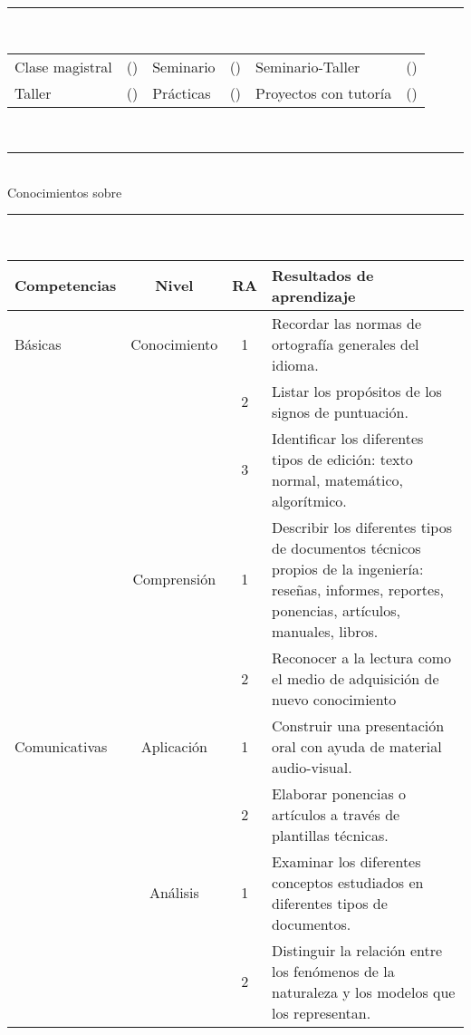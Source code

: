 \documentclass{article}
\begin{document}
\noindent\rule[0.8ex]{12.1cm}{0.25pt} \par
{} \\
\begin{tabular}{lclclc}
Clase magistral & () & Seminario & () & Seminario-Taller & () \\
Taller & () & Prácticas & () & Proyectos con tutoría & () \\
\end{tabular} \\

\noindent\rule[0.8ex]{12.1cm}{0.25pt} \par
{} \\
\noindent Conocimientos sobre  \\

\noindent\rule[0.8ex]{12.1cm}{0.25pt} \par
{} \\
\begin{tabular}{|l|c|c|p{5.1cm}|} \hline
{\bf Competencias} & {\bf Nivel} & {\bf RA} & {\bf Resultados de aprendizaje} \\ \hline
Básicas & Conocimiento & 1 & Recordar las normas de ortografía generales del idioma. \\
 & & 2 & Listar los propósitos de los signos de puntuación. \\
 & & 3 & Identificar los diferentes tipos de edición: texto normal, matemático, algorítmico.\\
 & Comprensión & 1 & Describir los diferentes tipos de documentos técnicos propios de la ingeniería: reseñas, informes, reportes, ponencias, artículos, manuales, libros. \\
 & & 2 & Reconocer a la lectura como el medio de adquisición de nuevo conocimiento \\ \hline
Comunicativas & Aplicación & 1 & Construir una presentación oral con ayuda de material audio-visual. \\
 & & 2 & Elaborar ponencias o artículos a través de plantillas técnicas. \\ 
 & Análisis & 1 & Examinar los diferentes conceptos estudiados en diferentes tipos de documentos. \\
 & & 2 & Distinguir la relación entre los fenómenos de la naturaleza y los modelos que los representan. \\ \hline
\end{tabular} \\
\end{document}
